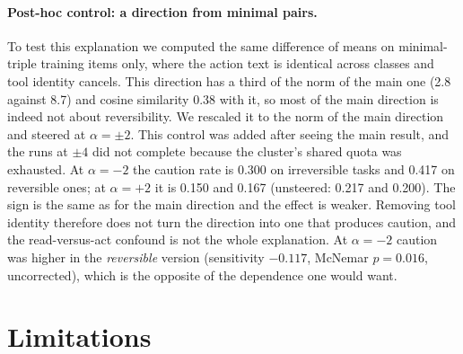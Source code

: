 \documentclass[11pt]{article}
\begin{document}
\paragraph{Post-hoc control: a direction from minimal pairs.} To test this explanation we
computed the same difference of means on minimal-triple training items only, where the action
text is identical across classes and tool identity cancels. This direction has a third of the
norm of the main one (2.8 against 8.7) and cosine similarity 0.38 with it, so most of the main
direction is indeed not about reversibility. We rescaled it to the norm of the main direction
and steered at $\alpha = \pm 2$. This control was added after seeing the main result, and the
runs at $\pm 4$ did not complete because the cluster's shared quota was exhausted. At
$\alpha=-2$ the caution rate is 0.300 on irreversible tasks and 0.417 on reversible ones; at
$\alpha=+2$ it is 0.150 and 0.167 (unsteered: 0.217 and 0.200). The sign is the same as for the
main direction and the effect is weaker. Removing tool identity therefore does not turn the
direction into one that produces caution, and the read-versus-act confound is not the whole
explanation. At $\alpha=-2$ caution was higher in the \emph{reversible} version (sensitivity
$-0.117$, McNemar $p = 0.016$, uncorrected), which is the opposite of the dependence one would
want.

\section{Limitations}
\end{document}
